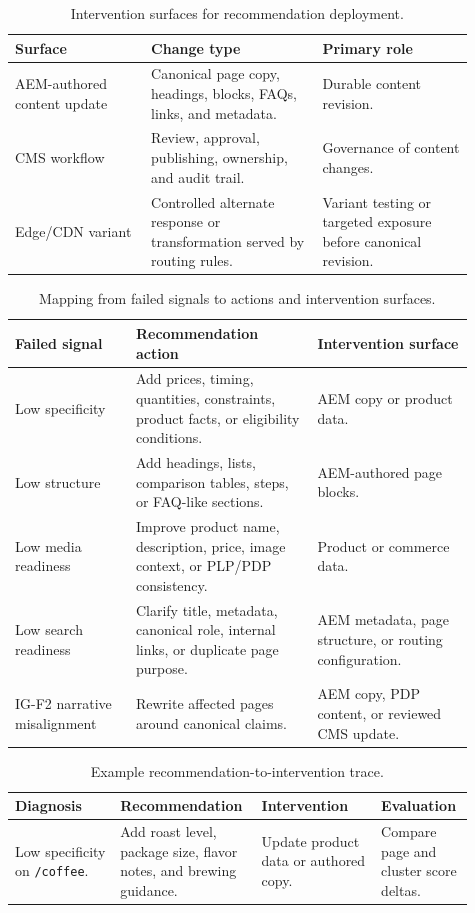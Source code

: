 \documentclass{article}
\begin{document}
\begin{table}[H]
\centering
\small
\begin{tabular}{@{}p{0.27\linewidth} p{0.34\linewidth} p{0.30\linewidth}@{}}
\textbf{Surface} & \textbf{Change type} & \textbf{Primary role} \\
\hline
AEM-authored content update & Canonical page copy, headings, blocks, FAQs, links, and metadata. & Durable content revision. \\
CMS workflow & Review, approval, publishing, ownership, and audit trail. & Governance of content changes. \\
Edge/CDN variant & Controlled alternate response or transformation served by routing rules. & Variant testing or targeted exposure before canonical revision. \\
\end{tabular}
\caption{Intervention surfaces for recommendation deployment.}
\label{tab:intervention-surfaces}
\end{table}

\begin{table}[H]
\centering
\small
\begin{tabular}{@{}p{0.24\linewidth} p{0.36\linewidth} p{0.31\linewidth}@{}}
\textbf{Failed signal} & \textbf{Recommendation action} & \textbf{Intervention surface} \\
\hline
Low specificity & Add prices, timing, quantities, constraints, product facts, or eligibility conditions. & AEM copy or product data. \\
Low structure & Add headings, lists, comparison tables, steps, or FAQ-like sections. & AEM-authored page blocks. \\
Low media readiness & Improve product name, description, price, image context, or PLP/PDP consistency. & Product or commerce data. \\
Low search readiness & Clarify title, metadata, canonical role, internal links, or duplicate page purpose. & AEM metadata, page structure, or routing configuration. \\
IG-F2 narrative misalignment & Rewrite affected pages around canonical claims. & AEM copy, PDP content, or reviewed CMS update. \\
\end{tabular}
\caption{Mapping from failed signals to actions and intervention surfaces.}
\label{tab:recommendation-intervention-map}
\end{table}

\begin{table}[H]
\centering
\small
\begin{tabular}{@{}p{0.22\linewidth} p{0.26\linewidth} p{0.25\linewidth} p{0.18\linewidth}@{}}
\textbf{Diagnosis} & \textbf{Recommendation} & \textbf{Intervention} & \textbf{Evaluation} \\
\hline
Low specificity on \texttt{/coffee}. & Add roast level, package size, flavor notes, and brewing guidance. & Update product data or authored copy. & Compare page and cluster score deltas. \\
\end{tabular}
\caption{Example recommendation-to-intervention trace.}
\label{tab:recommendation-example}
\end{table}
\end{document}
